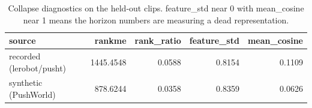\begin{table}[t]
\centering
\begin{tabular}{lrrrr}
\toprule
source & rankme & rank\_ratio & feature\_std & mean\_cosine \\
\midrule
recorded (lerobot/pusht) & 1445.4548 & 0.0588 & 0.8154 & 0.1109 \\
synthetic (PushWorld) & 878.6244 & 0.0358 & 0.8359 & 0.0626 \\
\bottomrule
\end{tabular}
\caption{Collapse diagnostics on the held-out clips. feature\_std near 0 with mean\_cosine near 1 means the horizon numbers are measuring a dead representation.}
\label{tab:collapse}
\end{table}
